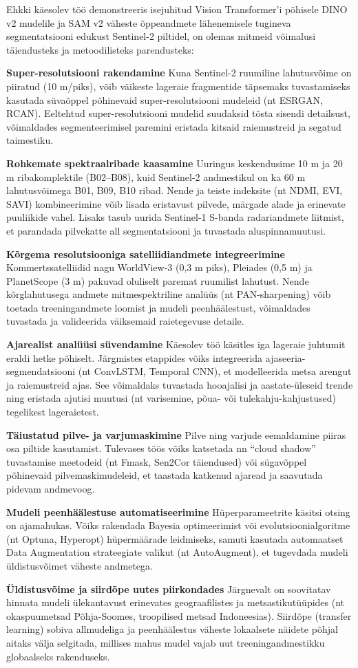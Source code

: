 Ehkki käesolev töö demonstreeris isejuhitud Vision Transformer'i põhisele DINO
v2 mudelile ja SAM v2 väheste õppeandmete lähenemisele tugineva segmentatsiooni
edukust Sentinel-2 piltidel, on olemas mitmeid võimalusi täiendusteks ja
metoodilisteks parendusteks:

\textbf{Super-resolutsiooni rakendamine} 
Kuna Sentinel-2 ruumiline lahutusvõime on
piiratud (10 m/piks), võib väikeste lageraie fragmentide täpsemaks tuvastamiseks
kasutada süvaõppel põhinevaid super-resolutsiooni mudeleid (nt ESRGAN, RCAN).
Eeltehtud super-resolutsiooni mudelid suudaksid tõsta sisendi detailsust,
võimaldades segmenteerimisel paremini eristada kitsaid raiemustreid ja segatud
taimestiku.

\textbf{Rohkemate spektraalribade kaasamine} Uuringus keskendusime 10 m ja 20 m
riba­komplektile (B02--B08), kuid Sentinel-2 andmestikul on ka 60 m
lahutusvõimega B01, B09, B10 ribad. Nende ja teiste indeksite (nt NDMI, EVI,
SAVI) kombineerimine võib lisada eristavust pilvede, märgade alade ja erinevate
puuliikide vahel. Lisaks tasub uurida Sentinel-1 S-banda radariandmete liitmist,
et parandada pilvekatte all segmentatsiooni ja tuvastada aluspinnamuutusi.

\textbf{Kõrgema resolutsiooniga satelliidiandmete integreerimine} Kommertssatelliidid
nagu WorldView-3 (0,3 m piks), Pleiades (0,5 m) ja PlanetScope (3 m) pakuvad
oluliselt paremat ruumilist lahutust. Nende kõrglahutusega andmete
mitmespektriline analüüs (nt PAN-sharpening) võib toetada treeningandmete
loomist ja mudeli peenhäälestust, võimaldades tuvastada ja valideerida
väiksemaid raietegevuse detaile.

\textbf{Ajarealist analüüsi süvendamine} Käesolev töö käsitles iga lageraie juhtumit
eraldi hetke põhiselt. Järgmistes etappides võiks integreerida
ajaseeria-segmendatsiooni (nt ConvLSTM, Temporal CNN), et modelleerida metsa
arengut ja raiemustreid ajas. See võimaldaks tuvastada hooajalisi ja
aastate-üleseid trende ning eristada ajutisi muutusi (nt varisemine, põua- või
tulekahju-kahjustused) tegelikest lageraietest.

\textbf{Täiustatud pilve- ja varjumaskimine} Pilve ning varjude eemaldamine piiras osa
piltide kasutamist. Tulevases töös võiks katsetada nn ``cloud shadow''
tuvastamise meetodeid (nt Fmask, Sen2Cor täiendused) või sügavõppel põhinevaid
pilvemaskimudeleid, et taastada katkenud ajaread ja saavutada pidevam andmevoog.

\textbf{Mudeli peenhäälestuse automatiseerimine} Hüperparameetrite käsitsi otsing on
ajamahukas. Võiks rakendada Bayesia optimeerimist või evolutsioonialgoritme (nt
Optuna, Hyperopt) hüpermäärade leidmiseks, samuti kasutada automaatset Data
Augmentation strateegiate valikut (nt AutoAugment), et tugevdada mudeli
üldistusvõimet väheste andmetega.

\textbf{Üldistusvõime ja siirdõpe uutes piirkondades} Järgnevalt on soovitatav hinnata
mudeli ülekantavust erinevates geograafilistes ja metsastikutüüpides (nt
okaspuumetsad Põhja-Soomes, troopilised metsad Indoneesias). Siirdõpe (transfer
learning) sobiva allmudeliga ja peenhäälestus väheste lokaalsete näidete põhjal
aitaks välja selgitada, millises mahus mudel vajab uut treeningandmestikku
globaalseks rakenduseks.